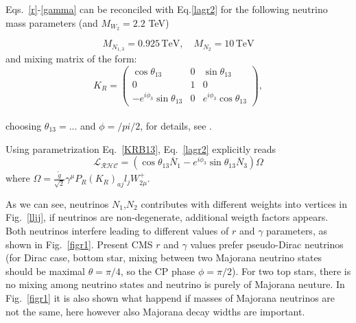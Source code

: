\documentclass[twocolumn,superscriptaddress,showpacs,prl,nofootinbib,floatfix]{revtex4}
\def\beq{\begin{equation}}
\def\eeq{\end{equation}}
\begin{document}



Eqs.~\ref{r}-\ref{gamma} can be reconciled with Eq.\ref{lagr2} for the following neutrino mass parameters (and $M_{W_2}=2.2$ TeV) 
 
\beq
M_{N_{1,3}}=0.925\,\mathrm{TeV},\quad M_{N_2}=10\,\mathrm{TeV}
\eeq
and mixing matrix of the form:
\beq\label{KRB13}
K_{R}=
\left(
\begin{array}{ccc}
\cos\theta_{13}&0&\sin\theta_{13}\\
0&1&0\\
-e^{i\phi_3}\sin\theta_{13}&0&e^{i\phi_3}\cos\theta_{13}
\end{array}
\right),
\eeq 
\\
choosing $\theta_{13}=...$ and $\phi=/pi/2$, for details, see  \cite{Gluza:2015goa}.

Using parametrization Eq.~\ref{KRB13}, Eq.~\ref{lagr2} explicitly reads
\beq
\mathcal{L_{RHC}}=    
{\left(
 \cos \theta_{13} \overline{N}_1 - e^{i \phi_3}\sin \theta_{13} \overline{N}_3
  \right)} \Omega
\label{lagr3}
\eeq
where $\Omega =\frac{\tilde{g}}{\sqrt{2}} \gamma^{\mu}P_R(K_{R})_{aj}l_jW_{2\mu}^{+}$. 

As we can see, neutrinos $N_1$,$N_2$ contributes with different weights into vertices in Fig.~\ref{lljj}, if neutrinos are non-degenerate, additional weigth factors appears. Both neutrinos interfere leading to different values of $r$ and $\gamma$ parameters, as shown in Fig.~\ref{figr1}. Present CMS $r$ and $\gamma$ values prefer pseudo-Dirac neutrinos (for Dirac case, bottom star, mixing between two Majorana neutrino states should be maximal $\theta=\pi/4$, so the CP phase $\phi=\pi/2$). For two top stars, there is no mixing among neutrino states and neutrino is purely of Majorana neuture. In Fig.~\ref{figr1}
it is also shown what happend if masses of Majorana neutrinos are not the same, here however also Majorana decay widths are important.
\end{document}
